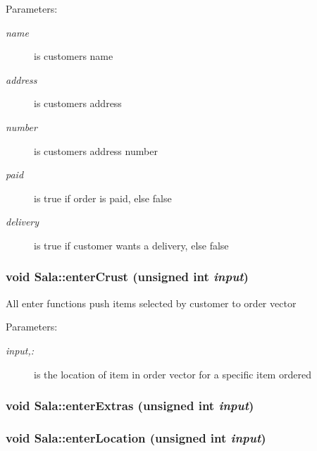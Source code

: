 \begin{Desc}
\item[Parameters:]
\begin{description}
\item[{\em name}]is customers name \item[{\em address}]is customers address \item[{\em number}]is customers address number \item[{\em paid}]is true if order is paid, else false \item[{\em delivery}]is true if customer wants a delivery, else false \end{description}
\end{Desc}
\hypertarget{class_sala_ae3b8375ca0ab5b62e84f86582b8cec3}{
\subsubsection[enterCrust]{\setlength{\rightskip}{0pt plus 5cm}void Sala::enter\-Crust (unsigned int {\em input})}}
\label{class_sala_ae3b8375ca0ab5b62e84f86582b8cec3}


All enter functions push items selected by customer to order vector

\begin{Desc}
\item[Parameters:]
\begin{description}
\item[{\em input,:}]is the location of item in order vector for a specific item ordered \end{description}
\end{Desc}
\hypertarget{class_sala_f4637151f3f934bdf727685020e956e2}{
\subsubsection[enterExtras]{\setlength{\rightskip}{0pt plus 5cm}void Sala::enter\-Extras (unsigned int {\em input})}}
\label{class_sala_f4637151f3f934bdf727685020e956e2}


\hypertarget{class_sala_d5b546b927926e2eed280fcdc087135e}{
\subsubsection[enterLocation]{\setlength{\rightskip}{0pt plus 5cm}void Sala::enter\-Location (unsigned int {\em input})}}
\label{class_sala_d5b546b927926e2eed280fcdc087135e}


